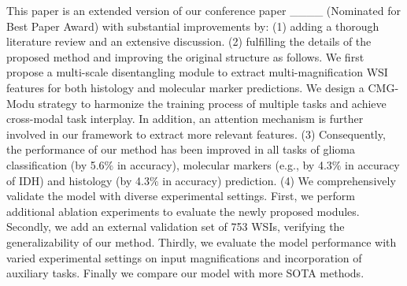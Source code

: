 This paper is an extended version of our conference paper ____ (Nominated for Best Paper Award) with substantial improvements by:
(1) adding a thorough literature review and an extensive discussion.
(2) fulfilling the details of the proposed method and improving the original structure as follows.
We first propose a multi-scale disentangling module to extract multi-magnification WSI features for both histology and molecular marker predictions.
We design a CMG-Modu strategy to harmonize the training process of multiple tasks and achieve cross-modal task interplay.
In addition, an attention mechanism is further involved in our framework to extract more relevant features. 
(3) Consequently, the performance of our method has been improved in all tasks of glioma classification (by 5.6$\%$ in accuracy), molecular markers (e.g., by 4.3$\%$ in accuracy of IDH) and histology (by 4.3$\%$ in accuracy) prediction.
(4) We comprehensively validate the model with diverse experimental settings. First, we perform additional ablation experiments to evaluate the newly proposed modules. Secondly, we add an external validation set of 753 WSIs, verifying the generalizability of our method.  Thirdly, we  evaluate the model performance with varied experimental settings on input magnifications and incorporation of auxiliary tasks. Finally we compare our model with more SOTA methods.






\vspace{-.5em}